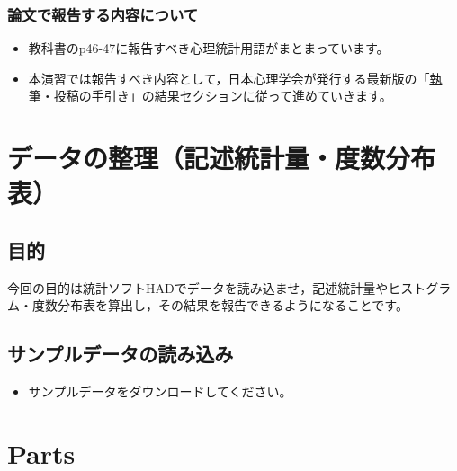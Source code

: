 \documentclass[
]{book}
\providecommand{\tightlist}{%
  \setlength{\itemsep}{0pt}\setlength{\parskip}{0pt}}
\theoremstyle{definition}
\theoremstyle{definition}
\theoremstyle{definition}
\theoremstyle{definition}
\theoremstyle{remark}
\begin{document}
\hypertarget{ux8ad6ux6587ux3067ux5831ux544aux3059ux308bux5185ux5bb9ux306bux3064ux3044ux3066}{%
\subsection{論文で報告する内容について}\label{ux8ad6ux6587ux3067ux5831ux544aux3059ux308bux5185ux5bb9ux306bux3064ux3044ux3066}}

\begin{itemize}
\tightlist
\item
  教科書のp46-47に報告すべき心理統計用語がまとまっています。
\item
  本演習では報告すべき内容として，日本心理学会が発行する最新版の「\href{https://psych.or.jp/manual/}{執筆・投稿の手引き}」の結果セクションに従って進めていきます。
\end{itemize}

\hypertarget{ux30c7ux30fcux30bfux306eux6574ux7406ux8a18ux8ff0ux7d71ux8a08ux91cfux5ea6ux6570ux5206ux5e03ux8868}{%
\chapter{データの整理（記述統計量・度数分布表）}\label{ux30c7ux30fcux30bfux306eux6574ux7406ux8a18ux8ff0ux7d71ux8a08ux91cfux5ea6ux6570ux5206ux5e03ux8868}}

\hypertarget{ux76eeux7684-1}{%
\section{目的}\label{ux76eeux7684-1}}

今回の目的は統計ソフトHADでデータを読み込ませ，記述統計量やヒストグラム・度数分布表を算出し，その結果を報告できるようになることです。

\hypertarget{ux30b5ux30f3ux30d7ux30ebux30c7ux30fcux30bfux306eux8aadux307fux8fbcux307f}{%
\section{サンプルデータの読み込み}\label{ux30b5ux30f3ux30d7ux30ebux30c7ux30fcux30bfux306eux8aadux307fux8fbcux307f}}

\begin{itemize}
\tightlist
\item
  サンプルデータをダウンロードしてください。
\end{itemize}

\hypertarget{parts}{%
\chapter{Parts}\label{parts}}
\end{document}
